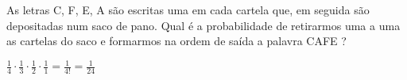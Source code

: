 \begin{ex}
As letras C, F, E, A são escritas uma em cada cartela que, em seguida são depositadas num saco de pano. Qual é a probabilidade de retirarmos uma a uma as cartelas do saco e formarmos na ordem de saída a palavra CAFE ?
  \begin{sol}
    $\frac{1}{4}\cdot\frac{1}{3}\cdot\frac{1}{2}\cdot\frac{1}{1}=\frac{1}{4!}=\frac{1}{24}$
  \end{sol}
\end{ex}